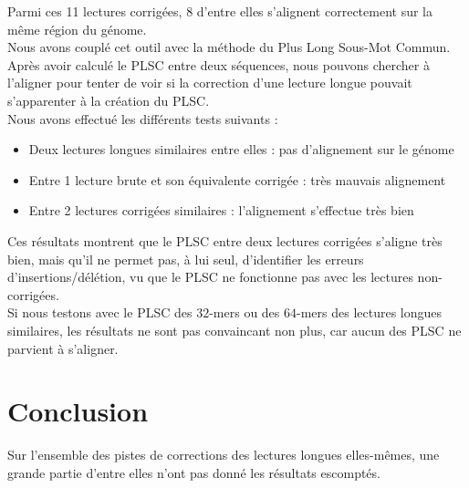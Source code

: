 \documentclass{report}
\begin{document}
      Parmi ces 11 lectures corrigées, 8 d'entre elles s'alignent correctement sur la même région du génome.\\

      Nous avons couplé cet outil avec la méthode du Plus Long Sous-Mot Commun. Après avoir calculé le PLSC entre deux séquences, nous pouvons chercher à l'aligner pour tenter de voir si la correction d'une lecture longue pouvait s'apparenter à la création du PLSC.\\

      Nous avons effectué les différents tests suivants :
      \begin{itemize}
        \item Deux lectures longues similaires entre elles : pas d'alignement sur le génome\\
        \item Entre 1 lecture brute et son équivalente corrigée : très mauvais alignement\\
        \item Entre 2 lectures corrigées similaires : l'alignement s'effectue très bien\\
      \end{itemize}
      Ces résultats montrent que le PLSC entre deux lectures corrigées s'aligne très bien, mais qu'il ne permet pas, à lui seul, d'identifier les erreurs d'insertions/délétion, vu que le PLSC ne fonctionne pas avec les lectures non-corrigées.\\

      Si nous testons avec le PLSC des $32$-mers ou des $64$-mers des lectures longues similaires, les résultats ne sont pas convaincant non plus, car aucun des PLSC ne parvient à s'aligner.
    \newpage
  \chapter{Conclusion}
    Sur l'ensemble des pistes de corrections des lectures longues elles-mêmes, une grande partie d'entre elles n'ont pas donné les résultats escomptés.\\
\end{document}
